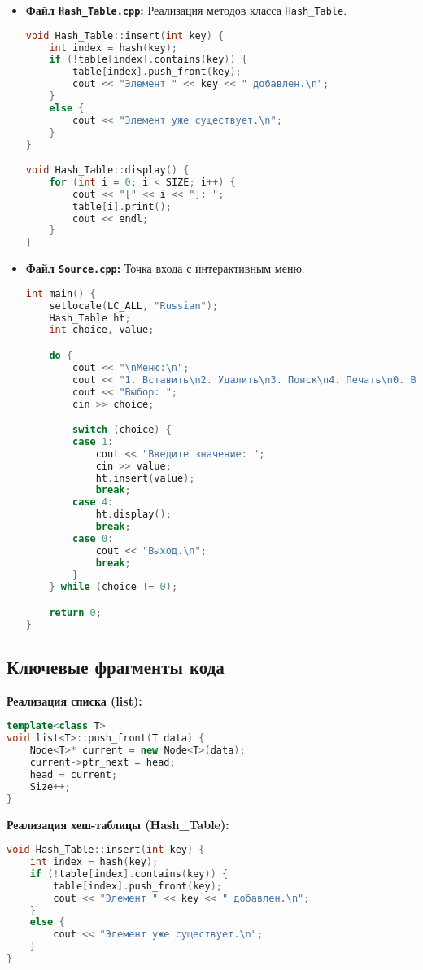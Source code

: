 \documentclass[12pt,a4paper]{scrartcl}
\begin{document}
\begin{itemize}
    \item \textbf{Файл \texttt{Hash_Table.cpp}:} Реализация методов класса \texttt{Hash_Table}.
\begin{lstlisting}[language=C++, caption=Фрагмент Hash_Table.cpp]
void Hash_Table::insert(int key) {
	int index = hash(key);
	if (!table[index].contains(key)) {
		table[index].push_front(key);
		cout << "Элемент " << key << " добавлен.\n";
	}
	else {
		cout << "Элемент уже существует.\n";
	}
}

void Hash_Table::display() {
	for (int i = 0; i < SIZE; i++) {
		cout << "[" << i << "]: ";
		table[i].print();
		cout << endl;
	}
}
\end{lstlisting}

    \item \textbf{Файл \texttt{Source.cpp}:} Точка входа с интерактивным меню.
\begin{lstlisting}[language=C++, caption=Фрагмент Source.cpp]
int main() {
	setlocale(LC_ALL, "Russian");
	Hash_Table ht;
	int choice, value;

	do {
		cout << "\nМеню:\n";
		cout << "1. Вставить\n2. Удалить\n3. Поиск\n4. Печать\n0. Выход\n";
		cout << "Выбор: ";
		cin >> choice;

		switch (choice) {
		case 1:
			cout << "Введите значение: ";
			cin >> value;
			ht.insert(value);
			break;
		case 4:
			ht.display();
			break;
		case 0:
			cout << "Выход.\n";
			break;
		}
	} while (choice != 0);

	return 0;
}
\end{lstlisting}
\end{itemize}

\subsection{Ключевые фрагменты кода}

\textbf{Реализация списка (list):}
\begin{lstlisting}[language=C++, caption=Метод push_front()]
template<class T>
void list<T>::push_front(T data) {
	Node<T>* current = new Node<T>(data);
	current->ptr_next = head;
	head = current;
	Size++;
}
\end{lstlisting}

\textbf{Реализация хеш-таблицы (Hash_Table):}
\begin{lstlisting}[language=C++, caption=Метод insert()]
void Hash_Table::insert(int key) {
	int index = hash(key);
	if (!table[index].contains(key)) {
		table[index].push_front(key);
		cout << "Элемент " << key << " добавлен.\n";
	}
	else {
		cout << "Элемент уже существует.\n";
	}
}
\end{lstlisting}
\end{document}
